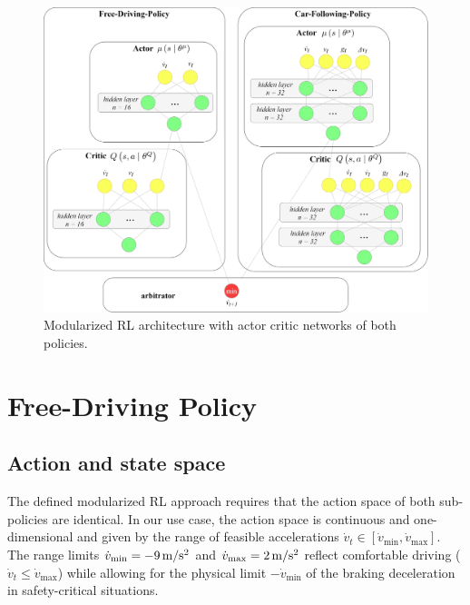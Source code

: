 \documentclass[review]{elsarticle}
\providecommand{\sub}[1]{_{\mathrm{#1}}}  %
\providecommand{\3}{{\ss}}
\begin{document}
	\begin{figure}
		\centering
		\includegraphics[width=12cm]{images/MRL_small}
		\caption{Modularized RL architecture with actor critic networks of both policies.} 
		\label{fig:MRL}
	\end{figure}
	
	
	
	
	
	
	\section{Free-Driving Policy}
	\label{sec:FreeDrivingPolicy}
	\subsection{Action and state space}
	\label{stateSpaceFree}
	The defined modularized RL approach requires that the action space of
	both sub-policies are identical. In our use case, the action space is
	continuous and one-dimensional and given by the range of feasible accelerations
	$\dot{v}_t \in [\dot{v}\sub{min}, \dot{v}\sub{max}]$. The range limits
	$\dot{v}\sub{min}= \unit[-9]{m/s^2}$ and  $\dot{v}\sub{max} =\unit[2]{m/s^2}$
	reflect comfortable driving ($\dot{v}_t \le \dot{v}\sub{max}$) while
	allowing for the physical limit $-\dot{v}\sub{min}$ of the braking
	deceleration in safety-critical
	situations.
	
\end{document}
